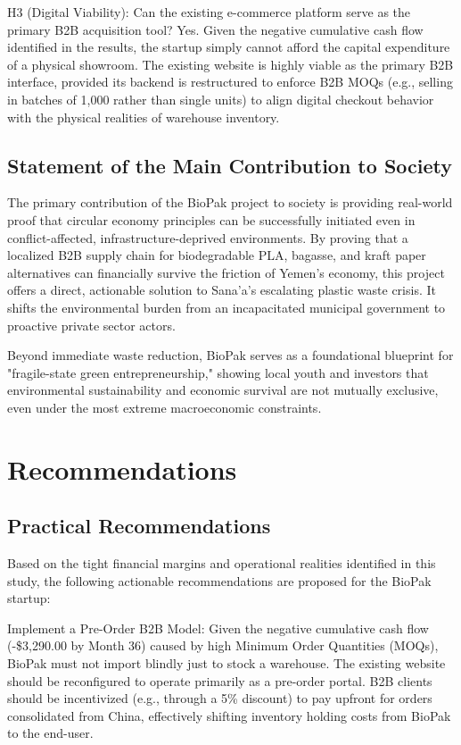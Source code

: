 \documentclass[12pt,a4paper]{article}
\begin{document}
H3 (Digital Viability): Can the existing e-commerce platform serve as the primary B2B acquisition tool? Yes. Given the negative cumulative cash flow identified in the results, the startup simply cannot afford the capital expenditure of a physical showroom. The existing website is highly viable as the primary B2B interface, provided its backend is restructured to enforce B2B MOQs (e.g., selling in batches of 1,000 rather than single units) to align digital checkout behavior with the physical realities of warehouse inventory.

\subsection{Statement of the Main Contribution to Society}

The primary contribution of the BioPak project to society is providing real-world proof that circular economy principles can be successfully initiated even in conflict-affected, infrastructure-deprived environments. By proving that a localized B2B supply chain for biodegradable PLA, bagasse, and kraft paper alternatives can financially survive the friction of Yemen's economy, this project offers a direct, actionable solution to Sana'a's escalating plastic waste crisis. It shifts the environmental burden from an incapacitated municipal government to proactive private sector actors.

Beyond immediate waste reduction, BioPak serves as a foundational blueprint for "fragile-state green entrepreneurship," showing local youth and investors that environmental sustainability and economic survival are not mutually exclusive, even under the most extreme macroeconomic constraints.

\section{Recommendations}

\subsection{Practical Recommendations}

Based on the tight financial margins and operational realities identified in this study, the following actionable recommendations are proposed for the BioPak startup:

Implement a Pre-Order B2B Model: Given the negative cumulative cash flow (-\$3,290.00 by Month 36) caused by high Minimum Order Quantities (MOQs), BioPak must not import blindly just to stock a warehouse. The existing website should be reconfigured to operate primarily as a pre-order portal. B2B clients should be incentivized (e.g., through a 5\% discount) to pay upfront for orders consolidated from China, effectively shifting inventory holding costs from BioPak to the end-user.
\end{document}
